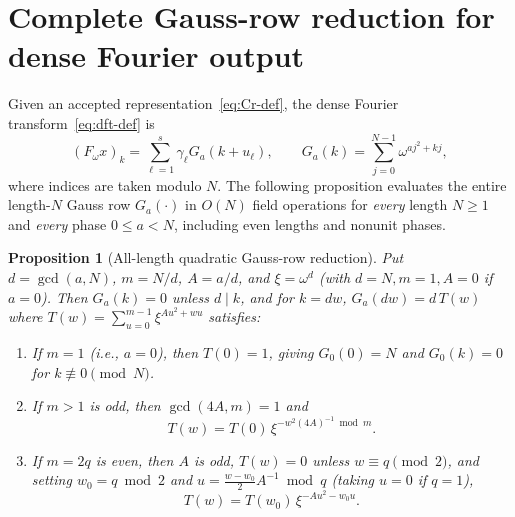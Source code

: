 \documentclass[11pt,reqno]{amsart}
\numberwithin{equation}{section}
\newtheorem{proposition}[theorem]{Proposition}
\theoremstyle{definition}
\theoremstyle{remark}
\begin{document}
\section{Complete Gauss-row reduction for dense Fourier output}
\label{sec:gauss}

Given an accepted representation~\eqref{eq:Cr-def}, the dense Fourier transform~\eqref{eq:dft-def} is
\begin{equation}
\label{eq:dft-gauss}
(F_\omega x)_k = \sum_{\ell=1}^s \gamma_\ell G_a(k + u_\ell),\qquad
G_a(k) = \sum_{j=0}^{N-1} \omega^{aj^2 + kj},
\end{equation}
where indices are taken modulo $N$. The following proposition evaluates the entire length-$N$ Gauss row $G_a(\cdot)$ in $O(N)$ field operations for \emph{every} length $N\ge 1$ and \emph{every} phase $0\le a<N$, including even lengths and nonunit phases.

\begin{proposition}[All-length quadratic Gauss-row reduction]
\label{prop:gauss}
Put $d = \gcd(a,N)$, $m = N/d$, $A = a/d$, and $\xi = \omega^d$ (with $d=N, m=1, A=0$ if $a=0$). Then $G_a(k) = 0$ unless $d\mid k$, and for $k = dw$, $G_a(dw) = d\,T(w)$ where $T(w) = \sum_{u=0}^{m-1} \xi^{Au^2 + wu}$ satisfies:
\begin{enumerate}[label=(\arabic*),leftmargin=2em]
\item If $m = 1$ (i.e., $a = 0$), then $T(0) = 1$, giving $G_0(0) = N$ and $G_0(k) = 0$ for $k\not\equiv 0\pmod N$.
\item If $m > 1$ is odd, then $\gcd(4A,m) = 1$ and
\begin{equation}
\label{eq:gauss-odd}
T(w) = T(0)\,\xi^{-w^2(4A)^{-1}\bmod m}.
\end{equation}
\item If $m = 2q$ is even, then $A$ is odd, $T(w) = 0$ unless $w\equiv q\pmod 2$, and setting $w_0 = q\bmod 2$ and $u = \frac{w - w_0}{2}A^{-1}\bmod q$ (taking $u=0$ if $q=1$),
\begin{equation}
\label{eq:gauss-even}
T(w) = T(w_0)\,\xi^{-Au^2 - w_0 u}.
\end{equation}
\end{enumerate}
\end{proposition}
\end{document}
